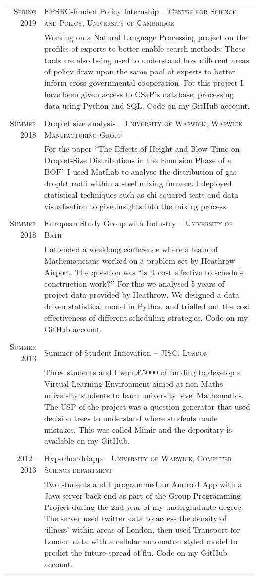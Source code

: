 \documentclass[a4paper,10pt]{article}
\begin{document}
\begin{tabular}{r|p{15.3cm}}
	\textsc{Spring 2019} & EPSRC-funded Policy Internship -- \textsc{Centre for Science and Policy, University of Cambridge}\\&\footnotesize{Working on a Natural Language Processing project on the profiles of experts to better enable search methods. These tools are also being used to understand how different areas of policy draw upon the same pool of experts to better inform cross governmental cooperation. For this project I have been given access to CSaP's database, processing data using Python and SQL. Code on my GitHub account.}\\\multicolumn{2}{c}{} \\
	\textsc{Summer 2018}& Droplet size analysis -- \textsc{University of Warwick, Warwick Manufacturing Group}\\&\footnotesize{For the paper ``The Effects of Height and Blow Time on Droplet-Size Distributions in the Emulsion Phase of a BOF'' I used MatLab to analyse the distribution of gas droplet radii within a steel mixing furnace. I deployed statistical techniques such as chi-squared tests and data visualisation to give insights into the mixing process.}\\\multicolumn{2}{c}{} \\
	\textsc{Summer 2018} & European Study Group with Industry -- \textsc{University of Bath} \\&\footnotesize{I attended a weeklong conference where a team of Mathematicians worked on a problem set by Heathrow Airport. The question was ``is it cost effective to schedule construction work?’’ For this we analysed 5 years of project data provided by Heathrow. We designed a data driven statistical model in Python and trialled out the cost effectiveness of different scheduling strategies. Code on my GitHub account.}\\\multicolumn{2}{c}{} \\
	\textsc{Summer 2013} & Summer of Student Innovation -- \textsc{JISC, London} \\&\footnotesize{Three students and I won £5000 of funding to develop a Virtual Learning Environment aimed at non-Maths university students to learn university level Mathematics. The USP of the project was a question generator that used decision trees to understand where students made mistakes. This was called Mimir and the depositary is available on my GitHub.}\\\multicolumn{2}{c}{} \\
	\textsc{2012--2013} & Hypochondriapp -- \textsc{University of Warwick, Computer Science department} \\&\footnotesize{Two students and I programmed an Android App with a Java server back end as part of the Group Programming Project during the 2nd year of my undergraduate degree. The server used twitter data to access the density of `illness' within areas of London, then used Transport for London data with a cellular automaton styled model to predict the future spread of flu. Code on my GitHub account.}\\\multicolumn{2}{c}{} \\
\end{tabular}
\end{document}
